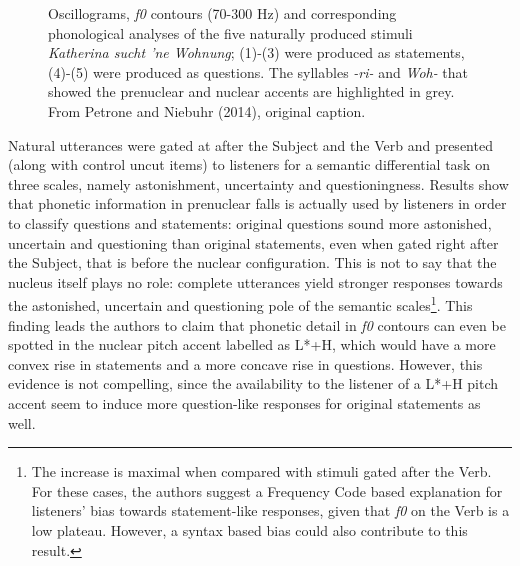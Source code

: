 \begin{figure}
\centering
{}
\caption{Oscillograms, \textit{f0} contours (70-300 Hz) and corresponding phonological analyses of the five naturally produced stimuli \textit{Katherina sucht 'ne Wohnung}; (1)-(3) were produced as statements, (4)-(5) were produced as questions. The syllables \textit{-ri-} and \textit{Woh-} that showed the prenuclear and nuclear accents are highlighted in grey. From Petrone and Niebuhr (2014), original caption.}
\label{fig302}\end{figure}

Natural utterances were gated at after the Subject and the Verb and presented (along with control uncut items) to listeners for a semantic differential task on three scales, namely astonishment, uncertainty and questioningness. Results show that phonetic information in prenuclear falls is actually used by listeners in order to classify questions and statements: original questions sound more astonished, uncertain and questioning than original statements, even when gated right after the Subject, that is before the nuclear configuration. This is not to say that the nucleus itself plays no role: complete utterances yield stronger responses towards the astonished, uncertain and questioning pole of the semantic scales\footnote{The increase is maximal when compared with stimuli gated after the Verb. For these cases, the authors suggest a Frequency Code based explanation for listeners' bias towards statement-like responses, given that \textit{f0} on the Verb is a low plateau. However, a syntax based bias could also contribute to this result.}. This finding leads the authors to claim that phonetic detail in \textit{f0} contours can even be spotted in the nuclear pitch accent labelled as L*+H, which would have a more convex rise in statements and a more concave rise in questions. However, this evidence is not compelling, since the availability to the listener of a L*+H pitch accent seem to induce more question-like responses for original statements as well.

